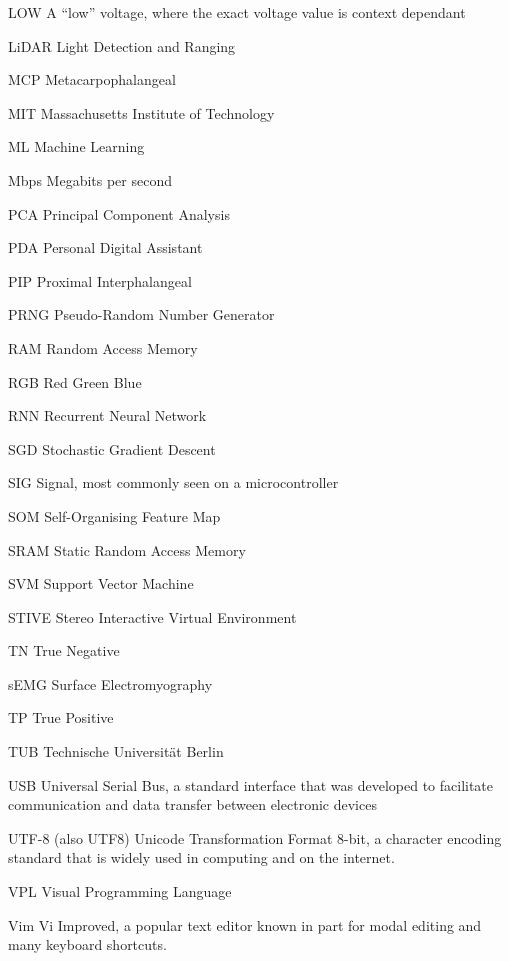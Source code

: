 \begin{Nomencl}[1cm]
    \item[LOW] A ``low'' voltage, where the exact voltage value is context dependant
    \item[LiDAR] Light Detection and Ranging
    \item[MCP] Metacarpophalangeal
    \item[MIT] Massachusetts Institute of Technology
    \item[ML] Machine Learning
    \item[Mbps] Megabits per second
    \item[PCA] Principal Component Analysis
    \item[PDA] Personal Digital Assistant
    \item[PIP] Proximal Interphalangeal
    \item[PRNG] Pseudo-Random Number Generator
    \item[RAM] Random Access Memory
    \item[RGB] Red Green Blue
    \item[RNN] Recurrent Neural Network
    \item[SGD] Stochastic Gradient Descent
    \item[SIG] Signal, most commonly seen on a microcontroller
    \item[SOM] Self-Organising Feature Map
    \item[SRAM] Static Random Access Memory
    \item[SVM] Support Vector Machine
    \item[STIVE] Stereo Interactive Virtual Environment
    \item[TN] True Negative
    \item[sEMG] Surface Electromyography
    \item[TP] True Positive
    \item[TUB] Technische Universität Berlin
    \item[USB] Universal Serial Bus, a standard interface that was developed to
        facilitate communication and data transfer between electronic devices
    \item[UTF-8] (also UTF8) Unicode Transformation Format 8-bit, a character
        encoding standard that is widely used in computing and on the internet.
    \item[VPL] Visual Programming Language
    \item[Vim] Vi Improved, a popular text editor known in part for modal
        editing and many keyboard shortcuts.


\end{Nomencl}
